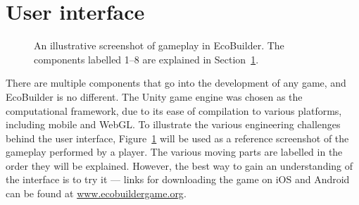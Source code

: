 \section{User interface}
\label{sec:user_interface}
\begin{figure}
    \centering
    \caption[A labelled screenshot of EcoBuilder gameplay]{An illustrative screenshot of gameplay in EcoBuilder. The components labelled 1--8 are explained in Section~\ref{sec:user_interface}.}
    \label{fig:eco_gameplay}
\end{figure}

There are multiple components that go into the development of any game, and EcoBuilder is no different. The Unity game engine \citep{Goldstone2009} was chosen as the computational framework, due to its ease of compilation to various platforms, including mobile and WebGL. To illustrate the various engineering challenges behind the user interface, Figure~\ref{fig:eco_gameplay} will be used as a reference screenshot of the gameplay performed by a player. The various moving parts are labelled in the order they will be explained.
However, the best way to gain an understanding of the interface is to try it --- links for downloading the game on iOS and Android can be found at \url{www.ecobuildergame.org}.

